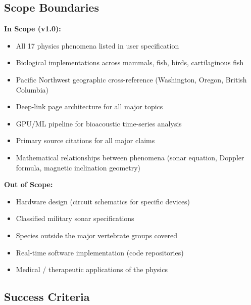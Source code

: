 \documentclass[11pt,letterpaper]{article}
\begin{document}
\subsection{Scope Boundaries}

\textbf{In Scope (v1.0):}
\begin{itemize}[noitemsep]
  \item All 17 physics phenomena listed in user specification
  \item Biological implementations across mammals, fish, birds, cartilaginous fish
  \item Pacific Northwest geographic cross-reference (Washington, Oregon, British Columbia)
  \item Deep-link page architecture for all major topics
  \item GPU/ML pipeline for bioacoustic time-series analysis
  \item Primary source citations for all major claims
  \item Mathematical relationships between phenomena (sonar equation, Doppler formula, magnetic inclination geometry)
\end{itemize}

\textbf{Out of Scope:}
\begin{itemize}[noitemsep]
  \item Hardware design (circuit schematics for specific devices)
  \item Classified military sonar specifications
  \item Species outside the major vertebrate groups covered
  \item Real-time software implementation (code repositories)
  \item Medical / therapeutic applications of the physics
\end{itemize}

\subsection{Success Criteria}
\end{document}
